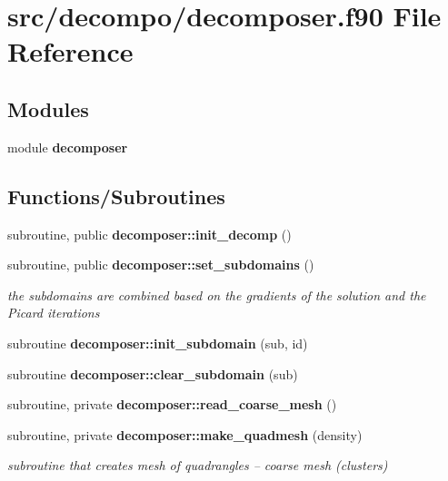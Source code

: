 \section{src/decompo/decomposer.f90 File Reference}
\label{decomposer_8f90}
\subsection*{Modules}
\begin{DoxyCompactItemize}
\item 
module {\bf decomposer}
\end{DoxyCompactItemize}
\subsection*{Functions/\+Subroutines}
\begin{DoxyCompactItemize}
\item 
subroutine, public {\bf decomposer\+::init\+\_\+decomp} ()
\item 
subroutine, public {\bf decomposer\+::set\+\_\+subdomains} ()
\begin{DoxyCompactList}\small\item\em the subdomains are combined based on the gradients of the solution and the Picard iterations \end{DoxyCompactList}\item 
subroutine {\bf decomposer\+::init\+\_\+subdomain} (sub, id)
\item 
subroutine {\bf decomposer\+::clear\+\_\+subdomain} (sub)
\item 
subroutine, private {\bf decomposer\+::read\+\_\+coarse\+\_\+mesh} ()
\item 
subroutine, private {\bf decomposer\+::make\+\_\+quadmesh} (density)
\begin{DoxyCompactList}\small\item\em subroutine that creates mesh of quadrangles -- coarse mesh (clusters) \end{DoxyCompactList}\end{DoxyCompactItemize}
